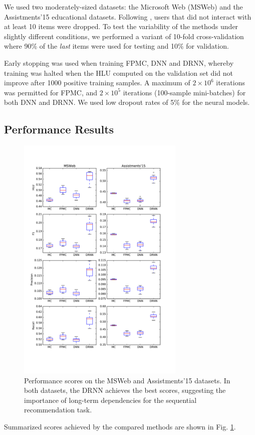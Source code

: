 \documentclass{sig-alternate-05-2015}
\begin{document}
We used two moderately-sized datasets: the Microsoft Web (MSWeb) and the Assistments'15 educational datasets. Following \cite{Rendle2010}, users that did not interact with at least 10 items were dropped. To test the variability of the methods under slightly different conditions, we performed a variant of 10-fold cross-validation where 90\% of the \emph{last} items were used for testing and 10\% for validation. 

Early stopping was used when training FPMC, DNN and DRNN, whereby training was halted when the HLU computed on the validation set did not improve after 1000 positive training samples. A maximum of $2\times 10^6$ iterations was permitted for FPMC, and $2\times 10^5$ iterations (100-sample mini-batches) for both DNN and DRNN. We used low dropout rates of 5\% for the neural models.

\subsection{Performance Results}
\begin{figure}
\includegraphics[width=8cm]{images/PerfBoxplots}		
\caption{Performance scores on the MSWeb and Assistments'15 datasets. In both datasets, the DRNN achieves the best scores,  suggesting the importance of long-term dependencies for the sequential recommendation task.}
\label{fig:PerfResults}
\end{figure}
Summarized scores achieved by the compared methods are shown in Fig. \ref{fig:PerfResults}.
\end{document}
